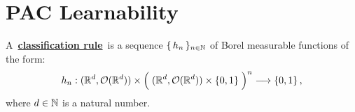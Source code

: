 

\section{PAC Learnability}
\setcounter{theorem}{0}
\setcounter{equation}{0}


\renewcommand{\theenumi}{\roman{enumi}}
\renewcommand{\labelenumi}{\textnormal{(\theenumi)}$\;\;$}


\begin{definition}
\mbox{}\vskip 0.1cm
\noindent
A \,\underline{\textbf{classification rule}}\, is a sequence $\{\,h_{n}\,\}_{n\in\mathbb{N}}$
of Borel measurable functions of the form:
\begin{equation*}
h_{n} :
	(\Re^{d},\mathcal{O}(\Re^{d})) \times \left(\;(\Re^{d},\mathcal{O}(\Re^{d})) \overset{{\color{white}.}}{\times} \{0,1\} \;\right)^{n}
	\longrightarrow
	\{0,1\}\,,
\end{equation*}
where $d \in \mathbb{N}$ is a natural number.
\end{definition}



